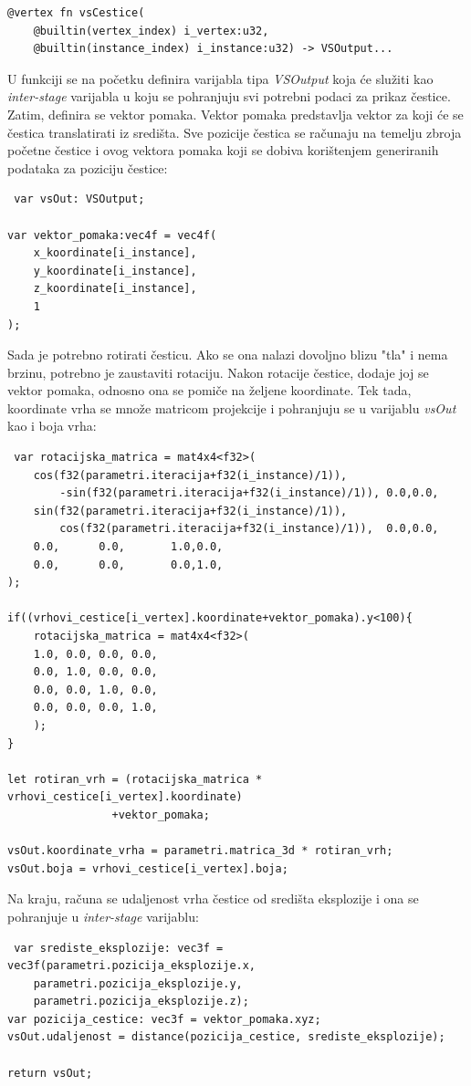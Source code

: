\documentclass{foi}
\begin{document}
\begin{verbatim}
@vertex fn vsCestice(
	@builtin(vertex_index) i_vertex:u32,
	@builtin(instance_index) i_instance:u32) -> VSOutput...
\end{verbatim}

U funkciji se na početku definira varijabla tipa \textit{VSOutput} koja će služiti kao \textit{inter-stage} varijabla u koju se pohranjuju svi potrebni podaci za prikaz čestice. Zatim, definira se vektor pomaka. Vektor pomaka predstavlja vektor za koji će se čestica translatirati iz središta. Sve pozicije čestica se računaju na temelju zbroja početne čestice i ovog vektora pomaka koji se dobiva korištenjem generiranih podataka za poziciju čestice:
\begin{verbatim}
 var vsOut: VSOutput;

var vektor_pomaka:vec4f = vec4f(
	x_koordinate[i_instance],
	y_koordinate[i_instance],
	z_koordinate[i_instance],
	1
);

\end{verbatim}

Sada je potrebno rotirati česticu. Ako se ona nalazi dovoljno blizu "tla" i nema brzinu, potrebno je zaustaviti rotaciju. Nakon rotacije čestice, dodaje joj se vektor pomaka, odnosno ona se pomiče na željene koordinate. Tek tada, koordinate vrha se množe matricom projekcije i pohranjuju se u varijablu \textit{vsOut} kao i boja vrha:
\begin{verbatim}
 var rotacijska_matrica = mat4x4<f32>(
	cos(f32(parametri.iteracija+f32(i_instance)/1)),
		-sin(f32(parametri.iteracija+f32(i_instance)/1)), 0.0,0.0,
	sin(f32(parametri.iteracija+f32(i_instance)/1)),
		cos(f32(parametri.iteracija+f32(i_instance)/1)),  0.0,0.0,
	0.0,      0.0,       1.0,0.0,
	0.0,      0.0,       0.0,1.0,
);

if((vrhovi_cestice[i_vertex].koordinate+vektor_pomaka).y<100){
	rotacijska_matrica = mat4x4<f32>(
	1.0, 0.0, 0.0, 0.0,
	0.0, 1.0, 0.0, 0.0,
	0.0, 0.0, 1.0, 0.0,
	0.0, 0.0, 0.0, 1.0,
	);
}

let rotiran_vrh = (rotacijska_matrica *  vrhovi_cestice[i_vertex].koordinate)
				+vektor_pomaka;
				
vsOut.koordinate_vrha = parametri.matrica_3d * rotiran_vrh;
vsOut.boja = vrhovi_cestice[i_vertex].boja;
\end{verbatim}

Na kraju, računa se udaljenost vrha čestice od središta eksplozije i ona se pohranjuje u \textit{inter-stage} varijablu:

\begin{verbatim}
 var srediste_eksplozije: vec3f = vec3f(parametri.pozicija_eksplozije.x,
	parametri.pozicija_eksplozije.y,
	parametri.pozicija_eksplozije.z);
var pozicija_cestice: vec3f = vektor_pomaka.xyz;
vsOut.udaljenost = distance(pozicija_cestice, srediste_eksplozije);

return vsOut;
\end{verbatim}
\end{document}
